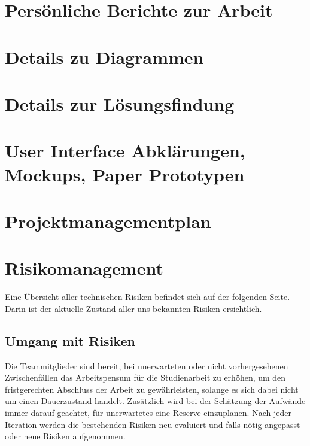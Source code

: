 \documentclass[12pt, a4paper]{report}
\begin{document}
	
	\chapter{Persönliche Berichte zur Arbeit}
	
	\chapter{Details zu Diagrammen}
	
	\chapter{Details zur Lösungsfindung}
	
	\chapter{User Interface Abklärungen, Mockups, Paper Prototypen}
	
	\chapter{Projektmanagementplan}
	
	
	\chapter{Risikomanagement}
	Eine Übersicht aller technischen Risiken befindet sich auf der folgenden Seite. Darin ist der aktuelle Zustand aller uns bekannten Risiken ersichtlich.
	
	\section{Umgang mit Risiken}
	Die Teammitglieder sind bereit, bei unerwarteten oder nicht vorhergesehenen Zwischenfällen das Arbeitspensum für die Studienarbeit zu erhöhen, um den fristgerechten Abschluss der Arbeit zu gewährleisten, solange es sich dabei nicht um einen Dauerzustand handelt. Zusätzlich wird bei der Schätzung der Aufwände immer darauf geachtet, für unerwartetes eine Reserve einzuplanen.
	Nach jeder Iteration werden die bestehenden Risiken neu evaluiert und falls nötig angepasst oder neue Risiken aufgenommen.
	
\end{document}
